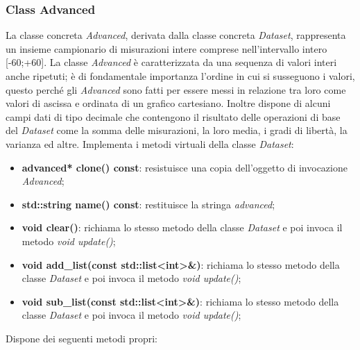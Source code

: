 \documentclass[a4paper,10pt]{article}
\begin{document}
    \subsubsection{Class Advanced}
    La classe concreta \textit{Advanced}, derivata dalla classe concreta \textit{Dataset}, rappresenta un insieme campionario di misurazioni intere comprese nell’intervallo intero [-60;+60]. La classe \textit{Advanced} è caratterizzata da una sequenza di valori interi anche ripetuti; è di fondamentale importanza l’ordine in cui si susseguono i valori, questo perché gli \textit{Advanced} sono fatti per essere messi in relazione tra loro come valori di ascissa e ordinata di un grafico cartesiano. Inoltre dispone di alcuni campi dati di tipo decimale che contengono il risultato delle operazioni di base del \textit{Dataset} come la somma delle misurazioni, la loro media, i gradi di libertà, la varianza ed altre.
    Implementa i metodi virtuali della classe \textit{Dataset}:
	\begin{itemize}
        \item \textbf{advanced* clone() const}: resistuisce una copia dell'oggetto di invocazione \textit{Advanced};
		\item \textbf{std::string name() const}: restituisce la stringa \textit{advanced};
        \item \textbf{void clear()}: richiama lo stesso metodo della classe \textit{Dataset} e poi invoca il metodo \textit{void update()};
		\item \textbf{void add\_list(const std::list<int>\&)}: richiama lo stesso metodo della classe \textit{Dataset} e poi invoca il metodo \textit{void update()};
        \item \textbf{void sub\_list(const std::list<int>\&)}: richiama lo stesso metodo della classe \textit{Dataset} e poi invoca il metodo \textit{void update()};
    \end{itemize}
    Dispone dei seguenti metodi propri:
\end{document}

